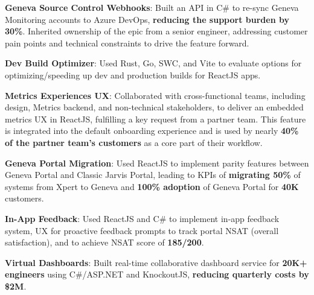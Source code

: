 \documentclass[letterpaper,11pt]{article}
\newcommand{\resumeItem}[2]{
  \item\small{
    \textbf{#1}{: #2 \vspace{-2pt}}
  }
}
\begin{document}
        
        \resumeItem{Geneva Source Control Webhooks}{Built an API in C\# to re-sync Geneva Monitoring accounts to Azure DevOps, \textbf{reducing the support burden by 30\%}. Inherited ownership of the epic from a senior engineer, addressing customer pain points and technical constraints to drive the feature forward.}

        \resumeItem{Dev Build Optimizer}{Used Rust, Go, SWC, and Vite to evaluate options for optimizing/speeding up dev  and production builds for ReactJS apps.
        }

       \resumeItem{Metrics Experiences UX}{Collaborated with cross-functional teams, including design, Metrics backend, and non-technical stakeholders, to deliver an embedded metrics UX in ReactJS, fulfilling a key request from a partner team. This feature is integrated into the default onboarding experience and is used by nearly \textbf{40\% of the partner team's customers} as a core part of their workflow.
       }

        \resumeItem{Geneva Portal Migration}{Used ReactJS to implement parity features  between Geneva Portal and Classic Jarvis Portal, leading to KPIs of \textbf{migrating 50\%} of systems from Xpert to Geneva and \textbf{100\% adoption} of Geneva Portal for \textbf{40K} customers.   
        }

        
       \resumeItem{In-App Feedback}{Used ReactJS and C\# to implement in-app feedback system, UX for proactive feedback prompts to track portal NSAT (overall satisfaction), and to achieve NSAT score of \textbf{185/200}.
        }

       \resumeItem{Virtual Dashboards}{Built real-time collaborative dashboard service for \textbf{20K+ engineers} using C\#/ASP.NET and KnockoutJS, \textbf{reducing quarterly costs by \$2M}.} 

\end{document}
